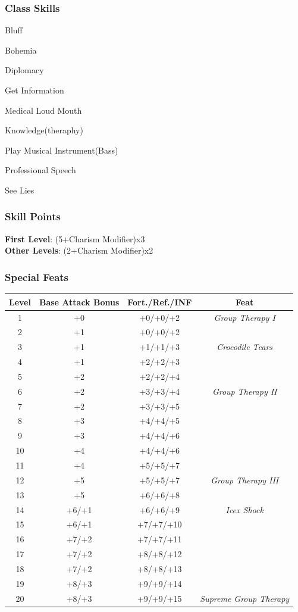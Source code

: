 \documentclass[ letterpaper,12pt]{article}
\begin{document}
\subsubsection{Class Skills}
\begin{itemize}
{\it
\item{Bluff}
\item{Bohemia}
\item{Diplomacy}
\item{Get Information}
\item{Medical Loud Mouth}
\item{Knowledge(theraphy)}
\item{Play Musical Instrument(Bass)}
\item{Professional Speech}
\item{See Lies}
}
\end{itemize}

\subsubsection{Skill Points}
{\bf First Level}: (5+Charism Modifier)x3\\
{\bf Other Levels}: (2+Charism Modifier)x2\\


\subsubsection{Special Feats}

\begin{center} \begin{tabular}{|c||c|c|c|}
\hline
{\bf Level}&{\bf Base Attack Bonus}&{\bf Fort./Ref./INF}&{\bf Feat}\\
\hline
1&+0&+0/+0/+2&{\it Group Therapy I}\\
\hline
2&+1&+0/+0/+2&\\
\hline
3&+1&+1/+1/+3&{\it Crocodile Tears}\\
\hline
4&+1&+2/+2/+3&\\
\hline
5&+2&+2/+2/+4&\\
\hline
6&+2&+3/+3/+4&{\it Group Therapy II}\\
\hline
7&+2&+3/+3/+5&\\
\hline
8&+3&+4/+4/+5&\\
\hline
9&+3&+4/+4/+6&\\
\hline
10&+4&+4/+4/+6&\\
\hline
11&+4&+5/+5/+7&\\
\hline
12&+5&+5/+5/+7&{\it Group Therapy III}\\
\hline
13&+5&+6/+6/+8&\\
\hline
14&+6/+1&+6/+6/+9&{\it Icex Shock}\\
\hline
15&+6/+1&+7/+7/+10&\\
\hline
16&+7/+2&+7/+7/+11&\\
\hline
17&+7/+2&+8/+8/+12&\\
\hline
18&+7/+2&+8/+8/+13&\\
\hline
19&+8/+3&+9/+9/+14&\\
\hline
20&+8/+3&+9/+9/+15&{\it Supreme Group Therapy}\\
\hline
\end{tabular} \end{center}
\end{document}

